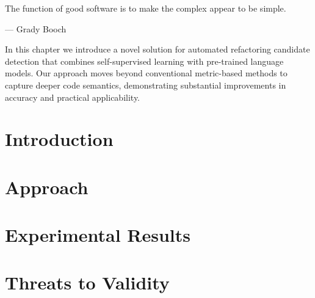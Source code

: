 \epigraph{The function of good software is to make the complex appear to be simple.}{--- \textup{Grady Booch}}

In this chapter we introduce a novel solution for automated refactoring candidate detection that combines self-supervised learning with pre-trained language models. Our approach moves beyond conventional metric-based methods to capture deeper code semantics, demonstrating substantial improvements in accuracy and practical applicability.


\section{Introduction}


\section{Approach}


\section{Experimental Results}


% 

\section{Threats to Validity}
